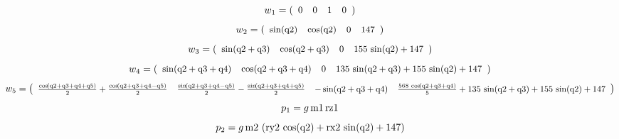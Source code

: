 \documentclass[fleqn, a4paper, 5pt, russian]{article}
\begin{document}
\begin{landscape}
\begin{equation}
{}\end{equation}
\begin{equation}
\small{
	w_1=
	\left(\begin{array}{cccc} 0 & 0 & 1 & 0 \end{array}\right)
}\end{equation}
\begin{equation}
\small{
	w_2=
	\left(\begin{array}{cccc} \sin\!\left(\mathrm{q2}\right) & \cos\!\left(\mathrm{q2}\right) & 0 & 147 \end{array}\right)
}\end{equation}
\begin{equation}
\small{
	w_3=
	\left(\begin{array}{cccc} \sin\!\left(\mathrm{q2} + \mathrm{q3}\right) & \cos\!\left(\mathrm{q2} + \mathrm{q3}\right) & 0 & 155\, \sin\!\left(\mathrm{q2}\right) + 147 \end{array}\right)
}\end{equation}
\begin{equation}
\small{
	w_4=
	\left(\begin{array}{cccc} \sin\!\left(\mathrm{q2} + \mathrm{q3} + \mathrm{q4}\right) & \cos\!\left(\mathrm{q2} + \mathrm{q3} + \mathrm{q4}\right) & 0 & 135\, \sin\!\left(\mathrm{q2} + \mathrm{q3}\right) + 155\, \sin\!\left(\mathrm{q2}\right) + 147 \end{array}\right)
}\end{equation}
\begin{equation}
\small{
	w_5=
	\left(\begin{array}{cccc} \frac{\cos\!\left(\mathrm{q2} + \mathrm{q3} + \mathrm{q4} + \mathrm{q5}\right)}{2} + \frac{\cos\!\left(\mathrm{q2} + \mathrm{q3} + \mathrm{q4} - \mathrm{q5}\right)}{2} & \frac{\sin\!\left(\mathrm{q2} + \mathrm{q3} + \mathrm{q4} - \mathrm{q5}\right)}{2} - \frac{\sin\!\left(\mathrm{q2} + \mathrm{q3} + \mathrm{q4} + \mathrm{q5}\right)}{2} & - \sin\!\left(\mathrm{q2} + \mathrm{q3} + \mathrm{q4}\right) & \frac{568\, \cos\!\left(\mathrm{q2} + \mathrm{q3} + \mathrm{q4}\right)}{5} + 135\, \sin\!\left(\mathrm{q2} + \mathrm{q3}\right) + 155\, \sin\!\left(\mathrm{q2}\right) + 147 \end{array}\right)
}\end{equation}
\begin{equation}
\small{
	p_1=
	g\, \mathrm{m1}\, \mathrm{rz1}
}\end{equation}
\begin{equation}
\small{
	p_2=
	g\, \mathrm{m2}\, \left(\mathrm{ry2}\, \cos\!\left(\mathrm{q2}\right) + \mathrm{rx2}\, \sin\!\left(\mathrm{q2}\right) + 147\right)
}
\end{equation}
\end{landscape}
\end{document}
